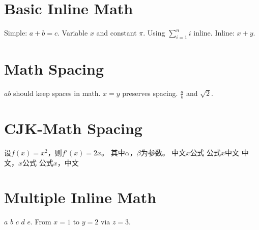 \documentclass{article}
\begin{document}
\section{Basic Inline Math}
Simple: $a+b=c$.
Variable $x$ and constant $\pi$.
Using \( \sum_{i=1}^{n} i \) inline.
Inline: \(x + y\).

\section{Math Spacing}
 $a  b$ should keep spaces in math.
 $x   =   y$ preserves spacing.
 $\frac{a}{b}$ and $\sqrt{2}$.

\section{CJK-Math Spacing}
设$f(x)=x^2$，则$f'(x)=2x$。
其中$\alpha$，$\beta$为参数。
中文$x$公式
公式$x$中文
中文，$x$公式
公式$x$，中文

\section{Multiple Inline Math}
 $a$ $b$ $c$ $d$ $e$.
From $x=1$ to $y=2$ via $z=3$.
\end{document}
